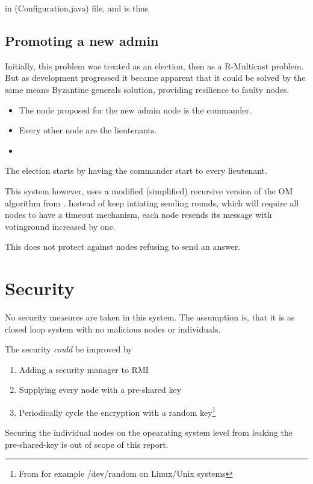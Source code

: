 \documentclass[10pt,a4paper]{article}
\begin{document}
in \File(Configuration.java) file, and is thus 

\subsection{Promoting a new admin}
\label{sec:admin_promotion}
Initially, this problem was treated as an election, then as a R-Multicast problem. But as development progressed it became apparent that it could be solved by the same means Byzantine generals solution, providing resilience to faulty nodes.
\begin{itemize}
\item The node proposed for the new admin node is the commander.
\item Every other node are the lieutenants.
\item 
\end{itemize}

The election starts by having the commander start  %
to every lieutenant.

This system however, uses a modified (simplified) recursive version of the OM algorithm from \cite{}. Instead of keep intiating sending rounds, which will require all nodes to have a timeout mechanism, each node resends its message with votinground increased by one.

This does not protect against nodes refusing to send an answer.


\section{Security}
No security measures are taken in this system. The assumption is, that it is as closed loop system with no malicious nodes or individuals.

The security \emph{could} be improved by 
\begin{enumerate}
\item Adding a security manager to RMI
\item Supplying every node with a pre-shared key
\item Periodically cycle the encryption with a random key\footnote{From for example /dev/random on Linux/Unix systems}
\end{enumerate}
Securing the individual nodes on the opearating system level from leaking the pre-shared-key is out of scope of this report.
\end{document}
